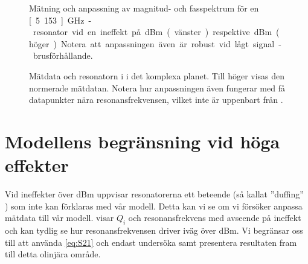 \documentclass[main.tex]{subfiles}
\begin{document}
\begin{figure}[H]
    \begin{subfigure}[t]{0.5\textwidth}
        \centerfloat
        \setlength{}
        \setlength\figureheight{12em}
        
    \end{subfigure}
    \begin{subfigure}[t]{0.5\textwidth}
        \centerfloat
        \setlength{}
        \setlength\figureheight{12em}
        
    \end{subfigure}
    \caption{Mätning och anpassning av magnitud- och fasspektrum för en \unit[5.153]{GHz}-resonator vid en ineffekt på \unit[-40]{dBm} (vänster) respektive \unit[-70]{dBm} (höger). Notera att anpassningen även är robust vid lågt signal-brusförhållande.}
    \label{fig:ex_magphs_resonator}
\end{figure}

\begin{figure}[H]
    \begin{subfigure}[t]{0.5\textwidth}
        \centerfloat
        \setlength{}
        \setlength\figureheight{9em}
        
    \end{subfigure}
    \begin{subfigure}[t]{0.5\textwidth}
        \centerfloat
        \setlength{}
        \setlength\figureheight{9em}
        
    \end{subfigure}
    \caption{Mätdata och resonatorn i  i det komplexa planet. Till höger visas den normerade mätdatan. Notera hur anpassningen även fungerar med få datapunkter nära resonansfrekvensen, vilket inte är uppenbart från . }
    \label{fig:ex_cmplx_resonator}
\end{figure}

\section{Modellens begränsning vid höga effekter}
Vid ineffekter över \unit[-70]{dBm} uppvisar resonatorerna ett beteende (så kallat ''duffing'' \cite{tholen2007}) som inte kan förklaras med vår modell. Detta kan vi se om vi försöker anpassa mätdata till vår modell.  visar $Q_i$ och resonansfrekvens med avseende på ineffekt och kan tydlig se hur resonansfrekvensen driver iväg över \unit[-70]{dBm}. Vi begränsar oss till att använda \ref{eq:S21} och endast undersöka samt presentera resultaten fram till detta olinjära område.
\end{document}
